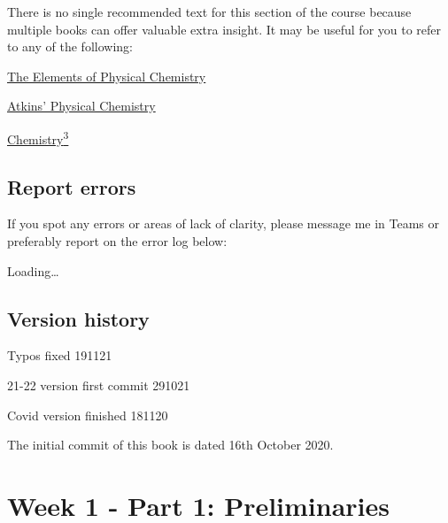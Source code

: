 \documentclass[
]{book}
\begin{document}
There is no single recommended text for this section of the course because multiple books can offer valuable extra insight. It may be useful for you to refer to any of the following:

\href{https://bath-ac-primo.hosted.exlibrisgroup.com/primo-explore/search?query=any,contains,Elements\%20of\%20physical\%20chemistry\&tab=local\&sortby=date\&vid=44BAT_VU1\&facet=frbrgroupid,include,978286819\&offset=0\&pcAvailability=false}{The Elements of Physical Chemistry}

\href{https://bath-ac-primo.hosted.exlibrisgroup.com/primo-explore/search?query=any,contains,physical\%20chemistry\%20de\%20paula\&tab=local\&search_scope=CSCOP_44BAT_DEEP\&sortby=date\&vid=44BAT_VU1\&facet=frbrgroupid,include,978327499\&offset=0\&pcAvailability=false}{Atkins' Physical Chemistry}

\href{https://bath-ac-primo.hosted.exlibrisgroup.com/primo-explore/search?query=any,contains,chemistry3\&tab=local\&search_scope=CSCOP_44BAT_DEEP\&sortby=date\&vid=44BAT_VU1\&facet=frbrgroupid,include,978293871\&offset=0\&pcAvailability=false}{Chemistry\textsuperscript{3}}

\hypertarget{report-errors}{%
\section*{Report errors}\label{report-errors}}

If you spot any errors or areas of lack of clarity, please message me in Teams or preferably report on the error log below:

Loading\ldots{}

\hypertarget{version-history}{%
\section*{Version history}\label{version-history}}

Typos fixed 191121

21-22 version first commit 291021

Covid version finished 181120

The initial commit of this book is dated 16th October 2020.

\hypertarget{ch:Part1}{%
\chapter{Week 1 - Part 1: Preliminaries}\label{ch:Part1}}
\end{document}
